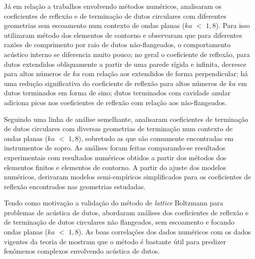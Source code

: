 Já em relação a trabalhos envolvendo métodos numéricos,  analisaram os coeficientes de reflexão e de terminação de dutos circulares com diferentes geometrias sem escoamento num contexto de ondas planas ($ka$ $<$ $1,8$). Para isso utilizaram método dos elementos de contorno e observaram que para diferentes razões de comprimento por raio de dutos não-flangeados, o comportamento acústico interno se diferencia muito pouco; no geral o coeficiente de reflexão, para dutos extendidos obliquamente a partir de uma parede rígida e infinita, decresce para altos números de $ka$ com relação aos extendidos de forma perpendicular; há uma redução significativa do coeficiente de reflexão para altos números de $ka$ em dutos terminados em forma de sino; dutos terminados com cavidade anular adiciona picos nos coeficientes de reflexão com relação aos não-flangeados.

Seguindo uma linha de análise semelhante,  analisaram coeficientes de terminação de dutos circulares com diversas geometrias de terminação num contexto de ondas planas ($ka$ $<$ $1,8$), sobretudo as que são comumente encontradas em instrumentos de sopro. As análises foram feitas comparando-se resultados experimentais com resultados numéricos obtidos a partir dos métodos dos elementos finitos e elementos de contorno. A partir do ajuste dos modelos numéricos, derivaram modelos semi-empíricos simplificados para os coeficientes de reflexão encontrados nas geometrias estudadas. 

Tendo como motivação a validação do método de \textit{lattice} Boltzmann para problemas de acústica de dutos,  abordaram análises dos coeficientes de reflexão e de terminação de dutos circulares não flangeados, sem escoamento e focando ondas planas ($ka$ $<$ $1,8$). As boas correlações dos dados numéricos com os dados vigentes da teoria de  mostram que o método é bastante útil para predizer fenômenos complexos envolvendo acústica de dutos.


